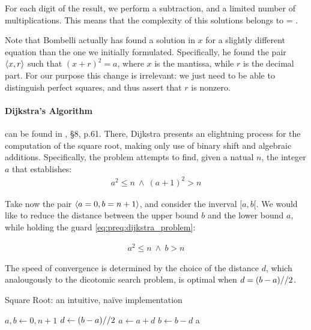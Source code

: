 For each digit of the result, we perform a subtraction, and a limited number of
multiplications. This means that the complexity of this solutions belongs to
 = .

\begin{remark}
  Note that Bombelli actually has found a solution in $x$ for a slightly
  different equation than the one we initially formulated. Specifically, he
  found the pair $\langle x, r\rangle$ such that $(x+r)^2=a$, where $x$ is the mantissa,
  while $r$ is the decimal part. For our purpose this change is irrelevant: we
  just need to be able to distinguish perfect squares, and thus assert that $r$
  is nonzero.
\end{remark}

\paragraph{Dijkstra's Algorithm \label{par:preq:sqrt:dijkstra}} can be found in
\cite{Dijkstra:adop}, \S 8, p.61. There, Dijkstra presents an elightning
process for the computation of the square root, making only use of binary shift
and algebraic additions.
Specifically, the problem attempts to find, given a natual $n$, the integer $a$
that establishes:
\begin{align}
  \label{eq:preq:dijkstra_problem}
  a^2 \leq n \: \land \: (a+1)^2 > n
\end{align}

Take now the pair $\langle a=0, b=n+1\rangle$, and consider the inverval
$[a, b[$. We would like to reduce the distance between the upper bound $b$ and
the lower bound $a$, while holding the guard \ref{eq:preq:dijkstra_problem}:

\begin{align*}
  a^2 \leq n \: \land \: b > n
\end{align*}

The speed of convergence is determined by the choice of the distance $d$, which
analougously to the dicotomic search problem, is optimal when
$d = (b-a) // 2$.

\begin{algorithm}[H]
  \caption{Square Root: an intuitive, na\"ive implementation}
  \label{alg:sqrt:dijkstra_naif}
  \begin{algorithmic}[1]
    \State $a, b \gets 0, n+1$
      \State $d \gets (b-a) // 2$
         $a \gets a+d$
         $b \gets b-d$
      \EndIf
    \EndWhile
    \State \Return a
  \end{algorithmic}
\end{algorithm}

